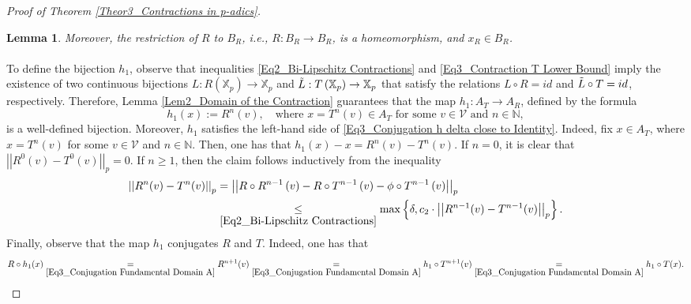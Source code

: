 \documentclass[a4paper, 12pt]{article}
\newtheorem{lemma}[theorem]{Lemma}
\theoremstyle{definition}
\begin{document}
\begin{proof}[Proof of Theorem \ref{Theor3_Contractions in p-adics}]
\begin{lemma}
			Moreover, the restriction of $R$ to $B_{R}$, i.e., $R: B_{R} \to B_{R}$, is a homeomorphism, and $x_{R} \in B_{R}$. 
			
		\end{lemma}
		
		\paragraph{}
		
		To define the bijection $h_{1}$, observe that inequalities \eqref{Eq2_Bi-Lipschitz Contractions} and \eqref{Eq3_Contraction T Lower Bound} imply the existence of two continuous bijections $L: R \left(  \mathbb{X}_{p}  \right)  \to \mathbb{X}_{p}$ and $\Tilde{L}: T \left(  \mathbb{X}_{p}  \right)  \to \mathbb{X}_{p}$ that satisfy the relations $L \circ R = id$ and $ \Tilde{L} \circ T = id$, respectively. Therefore, Lemma \ref{Lem2_Domain of the Contraction} guarantees that the map $h_{1}: A_{T} \to A_{R}$, defined by the formula  
		\begin{equation}\label{Eq3_Conjugation Fundamental Domain A}
			h_{1} \left(  x  \right)   :=   R^{n} \left(  v  \right) , \quad \text{where } x = T^{n} \left(  v  \right)  \in A_{T}   \text{ for some } v \in \mathcal{V} \text{ and } n \in  \mathbb{N} ,   
		\end{equation} 
		is a well-defined bijection. 
		Moreover, $h_{1}$  satisfies the left-hand side of \eqref{Eq3_Conjugation h delta close to Identity}. Indeed, fix $ x \in A_{T}$, where $x = T^{n} \left(  v  \right) $ for some $v \in \mathcal{V}$ and $n \in \mathbb{N} $. Then, one has that $h_{1}(x) - x = R^{n}(v) - T^{n}(v)$. 
		If $n=0$, it is clear that $ \left| \left|  R^{0}(v) - T^{0}(v)  \right|  \right|_{p} = 0$. If $n \ge 1$, then the claim follows inductively from the inequality 
		\begin{align*}
			\left| \left|  R^{n}(v) - T^{n}(v)  \right|  \right|_{p}   & =    \left| \left|  R\circ R^{n-1} \left(  v  \right)  - R\circ T^{n-1} \left(  v  \right)  - \phi\circ T^{n-1} \left(  v  \right)   \right|  \right|_{p} \\ 
			& \underset{\eqref{Eq2_Bi-Lipschitz Contractions}}{\le}   \max \left\{  \delta, c_{2}\cdot  \left| \left|  R^{n-1}(v) - T^{n-1}(v)  \right|  \right|_{p}  \right\}  .
		\end{align*}
		Finally, observe that the map $h_{1}$ conjugates $R$ and $T$. Indeed, one has that  
		\begin{equation}\label{Eq3_Homeomorphism 1 Conjugation}
			R\circ h_{1}(x)    \underset{\eqref{Eq3_Conjugation Fundamental Domain A}}{=}    R^{n+1}(v)    \underset{\eqref{Eq3_Conjugation Fundamental Domain A}}{=}    h_{1}\circ T^{n+1}(v)    \underset{\eqref{Eq3_Conjugation Fundamental Domain A}}{=}    h_{1}\circ T(x) .
		\end{equation}
		

\end{proof}
\end{document}
